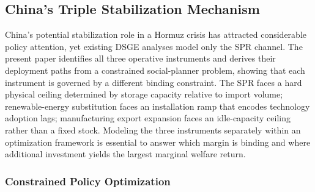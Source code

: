 \documentclass[12pt]{article}
\begin{document}
\subsection{China's Triple Stabilization Mechanism}

China's potential stabilization role in a Hormuz crisis has attracted considerable policy attention, yet existing DSGE analyses \citep{zhang2020china} model only the SPR channel. The present paper identifies all three operative instruments and derives their deployment paths from a constrained social-planner problem, showing that each instrument is governed by a different binding constraint. The SPR faces a hard physical ceiling determined by storage capacity relative to import volume; renewable-energy substitution faces an installation ramp that encodes technology adoption lags; manufacturing export expansion faces an idle-capacity ceiling rather than a fixed stock. Modeling the three instruments separately within an optimization framework is essential to answer which margin is binding and where additional investment yields the largest marginal welfare return.

\subsubsection*{Constrained Policy Optimization}
\end{document}
